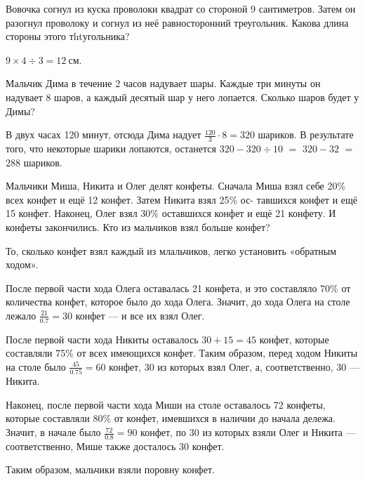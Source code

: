 

\begin{itemize}

	\itA Вовочка согнул из куска проволоки квадрат со стороной 9 сантиметров. Затем он разогнул проволоку и согнул из неё равносторонний треугольник. Какова длина стороны этого тhtугольника?

	\itr $9 \times 4 \div 3 = \SI{12}{\text{см}}$.

	\itB Мальчик Дима в течение 2 часов надувает шары. Каждые три минуты он надувает 8 шаров, а каждый десятый шар у него лопается. Сколько шаров будет у Димы?
	
	\itr В двух часах 120 минут, отсюда Дима надует $\tfrac{120}{3} \cdot 8 = 320$ шариков. В результате того, что некоторые шарики лопаются, останется $320 - 320 \div 10$ $=$ $320 - 32$ $=$ $288$ шариков.
	
	\itC Мальчики Миша, Никита и Олег делят конфеты. Сначала Миша взял себе 20\% всех конфет и ещё 12 конфет. Затем Никита взял 25\% ос- тавшихся конфет и ещё 15 конфет. Наконец, Олег взял 30\% оставшихся конфет и ещё 21 конфету. И конфеты закончились. Кто из мальчиков взял больше конфет?
	
	\itr То, сколько конфет взял каждый из млальчиков, легко установить «обратным ходом».
	
	После первой части хода Олега оставалась 21 конфета, и это составляло 70\% от количества конфет, которое было до хода Олега. Значит, до хода Олега на столе лежало $\tfrac{21}{0.7} = 30$ конфет — и все их взял Олег.
	
	После первой части хода Никиты оставалось $30+15=45$ конфет, которые составляли 75\% от всех имеющихся конфет. Таким образом, перед ходом Никиты на столе было $\tfrac{45}{0.75}=60$ конфет, 30 из которых взял Олег, а, соответственно, 30 — Никита.
	
	Наконец, после первой части хода Миши на столе оставалось 72 \linebreak конфеты, которые составляли 80\% от конфет, имевшихся в наличии до начала дележа. Значит, в начале было $\tfrac{72}{0.8} = 90$ конфет, по 30 из которых взяли Олег и Никита — соответственно, Мише также досталось 30 конфет.
	
	Таким образом, мальчики взяли поровну конфет.

\end{itemize}


